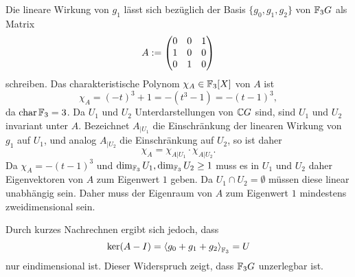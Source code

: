 \documentclass[a4paper,10pt]{article}
\begin{document}
Die lineare Wirkung von $g_1$ lässt sich bezüglich der Basis $\{g_0, g_1, g_2\}$ von $\mathbb{F}_3 G$ als Matrix
\[
 A := \begin{pmatrix}0 & 0 & 1 \\ 1 & 0 & 0 \\ 0 & 1 & 0\end{pmatrix}
\]
schreiben. Das charakteristische Polynom $\chi_A \in \mathbb{F}_3[X]$ von $A$ ist
\[
 \chi_A = (-t)^3 + 1 = -\left(t^3-1\right) = -(t-1)^3,
\]
da $\operatorname{char} \mathbb{F}_3 = 3$. Da $U_1$ und $U_2$ Unterdarstellungen von $\mathbb{C} G$ sind, sind $U_1$ und $U_2$ invariant unter $A$. Bezeichnet $A_{|U_1}$ die Einschränkung der linearen Wirkung von $g_1$ auf $U_1$, und analog $A_{|U_2}$ die Einschränkung auf $U_2$, so ist daher
\[
 \chi_A = \chi_{A|U_1} \cdot \chi_{A|U_2}.
\]
Da $\chi_A = -(t-1)^3$ und $\dim_{\mathbb{F}_3} U_1, \dim_{\mathbb{F}_3} U_2 \geq 1$ muss es in $U_1$ und $U_2$ daher Eigenvektoren von $A$ zum Eigenwert $1$ geben. Da $U_1 \cap U_2 = \emptyset$ müssen diese linear unabhängig sein. Daher muss der Eigenraum von $A$ zum Eigenwert $1$ mindestens zweidimensional sein.

Durch kurzes Nachrechnen ergibt sich jedoch, dass
\[
 \ker (A-I) = \left\langle g_0 + g_1 + g_2 \right\rangle_{\mathbb{F}_3} = U
\]
nur eindimensional ist. Dieser Widerspruch zeigt, dass $\mathbb{F}_3 G$ unzerlegbar ist.
\end{document}
